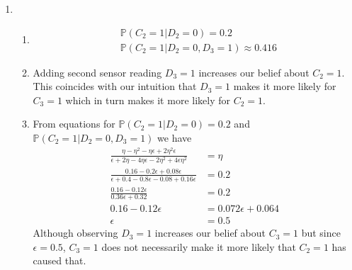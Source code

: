 \documentclass[12pt]{article}
\begin{document}
\begin{enumerate}[label=(\alph*)]
	\item
	\begin{enumerate}[label=\roman*]
		\item
		\begin{align*}
			&\mathbb{P}(C_2 = 1 | D_2 = 0) = 0.2 \\
			&\mathbb{P}(C_2 = 1 | D_2 = 0, D_3 = 1)	\approx 0.416
		\end{align*}
		\item
		Adding second sensor reading $D_3 = 1$ increases our belief about $C_2 = 1$. This coincides with our intuition that $D_3 = 1$ makes it more likely for $C_3 = 1$ which in turn makes it more likely for $C_2 = 1$.
		\item From equations for $\mathbb{P}(C_2 = 1 | D_2 = 0) = 0.2$ and $\mathbb{P}(C_2 = 1 | D_2 = 0, D_3 = 1)$ we have
		\begin{align*}
			\frac{\eta - \eta^2 - \eta\epsilon + 2\eta^2\epsilon}{\epsilon + 2\eta - 4\eta\epsilon - 2\eta^2 + 4\epsilon\eta^2} &= \eta \\
			\frac{0.16 - 0.2\epsilon + 0.08\epsilon}{\epsilon + 0.4 - 0.8\epsilon - 0.08 + 0.16\epsilon} &= 0.2 \\
			\frac{0.16 - 0.12\epsilon}{0.36\epsilon + 0.32} &= 0.2 \\
			0.16 - 0.12\epsilon &= 0.072\epsilon + 0.064 \\
			\epsilon &= 0.5
		\end{align*}
		Although observing $D_3 = 1$ increases our belief about $C_3 = 1$ but since $\epsilon = 0.5$, $C_3 = 1$ does not necessarily make it more likely that $C_2 = 1$ has caused that.
	\end{enumerate}
\end{enumerate}
\end{document}
